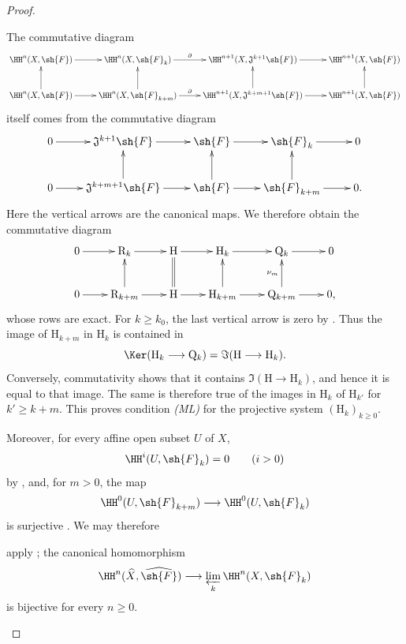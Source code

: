 \begin{proof}
\begin{env}[4.1.7.21]
\label{III.4.1.7.21}
The commutative diagram
\[
  \xymatrix@C=2.5em{
    \HH^n(X,\sh{F})
      \ar[r]
    &
    \HH^n(X,\sh{F}_k)
      \ar[r]^-{\partial}
    &
    \HH^{n+1}(X,\mathfrak{J}^{k+1}\sh{F})
      \ar[r]
    &
    \HH^{n+1}(X,\sh{F})
    \\
    \HH^n(X,\sh{F})
      \ar[r]\ar[u]
    &
    \HH^n(X,\sh{F}_{k+m})
      \ar[r]^-{\partial}\ar[u]
    &
    \HH^{n+1}(X,\mathfrak{J}^{k+m+1}\sh{F})
      \ar[r]\ar[u]
    &
    \HH^{n+1}(X,\sh{F})
      \ar[u]
  }
\]
itself comes from the commutative diagram
\[
  \xymatrix{
    0\ar[r]
    &
    \mathfrak{J}^{k+1}\sh{F}\ar[r]
    &
    \sh{F}\ar[r]
    &
    \sh{F}_k\ar[r]
    &
    0
    \\
    0\ar[r]
    &
    \mathfrak{J}^{k+m+1}\sh{F}\ar[r]\ar[u]
    &
    \sh{F}\ar[r]\ar[u]
    &
    \sh{F}_{k+m}\ar[r]\ar[u]
    &
    0.
  }
\]
Here the vertical arrows are the canonical maps.
We therefore obtain the commutative diagram
\[
  \xymatrix@C=2.2em{
    0\ar[r]
    &
    \mathrm{R}_k\ar[r]
    &
    \mathrm{H}\ar[r]
    &
    \mathrm{H}_k\ar[r]
    &
    \mathrm{Q}_k\ar[r]
    &
    0
    \\
    0\ar[r]
    &
    \mathrm{R}_{k+m}\ar[r]\ar[u]
    &
    \mathrm{H}\ar[r]\ar@{=}[u]
    &
    \mathrm{H}_{k+m}\ar[r]\ar[u]
    &
    \mathrm{Q}_{k+m}\ar[r]\ar[u]^{\nu_m}
    &
    0,
  }
\]
whose rows are exact.
For $k\geq k_0$, the last vertical arrow is zero by
.
Thus the image of $\mathrm{H}_{k+m}$ in $\mathrm{H}_k$ is contained
in
\[
  \Ker(\mathrm{H}_k\longrightarrow\mathrm{Q}_k)
  =
  \Im(\mathrm{H}\longrightarrow\mathrm{H}_k).
\]
Conversely, commutativity shows that it contains
$\Im(\mathrm{H}\to\mathrm{H}_k)$, and hence it is equal to that
image.
The same is therefore true of the images in $\mathrm{H}_k$ of
$\mathrm{H}_{k'}$ for $k'\geq k+m$.
This proves condition \emph{(ML)} for the projective system
$(\mathrm{H}_k)_{k\geq0}$.

Moreover, for every affine open subset $U$ of $X$,
\[
  \HH^i(U,\sh{F}_k)=0
  \qquad(i>0)
\]
by , and, for $m>0$, the map
\[
  \HH^0(U,\sh{F}_{k+m})
  \longrightarrow
  \HH^0(U,\sh{F}_k)
\]
is surjective .
We may therefore


apply ; the canonical homomorphism
\[
  \HH^n(\widehat{X},\widehat{\sh{F}})
  \longrightarrow
  \varprojlim_k\HH^n(X,\sh{F}_k)
\]
is bijective for every $n\geq0$.


\end{env}
\end{proof}
